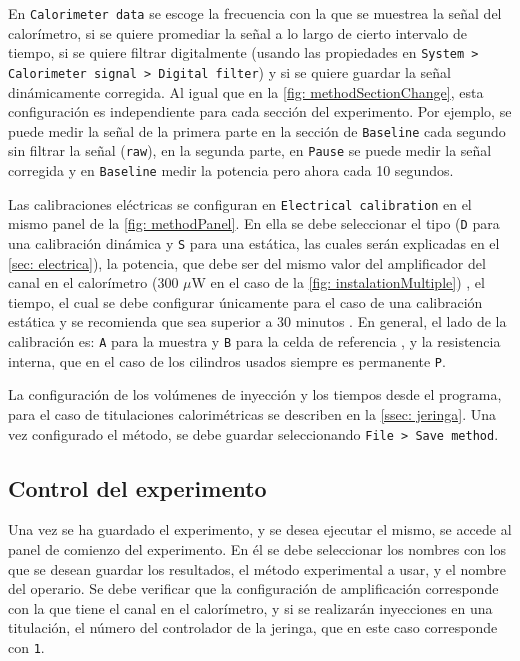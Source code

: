 	En \texttt{Calorimeter data} se escoge la frecuencia con la que se muestrea la se\~nal del calor\'imetro, si se quiere promediar la se\~nal a lo largo de cierto intervalo de tiempo, si se quiere filtrar digitalmente (usando las propiedades en \texttt{System > Calorimeter signal > Digital filter}) y si se quiere guardar la se\~nal din\'amicamente corregida. Al igual que en la \autoref{fig: methodSectionChange}, esta configuraci\'on es independiente para cada secci\'on del experimento. Por ejemplo, se puede medir la se\~nal de la primera parte en la secci\'on de \texttt{Baseline} cada segundo sin filtrar la se\~nal (\texttt{raw}), en la segunda parte, en \texttt{Pause} se puede medir la se\~nal corregida y en \texttt{Baseline} medir la potencia pero ahora cada 10 segundos.
	
	Las calibraciones el\'ectricas se configuran en \texttt{Electrical calibration} en el mismo panel de la \autoref{fig: methodPanel}. En ella se debe seleccionar el tipo (\texttt{D} para una calibraci\'on din\'amica y \texttt{S} para una est\'atica, las cuales ser\'an explicadas en el \autoref{sec: electrica}), la potencia, que debe ser del mismo valor del amplificador del canal en el calor\'imetro (300 $\mu$W en el caso de la \autoref{fig: instalationMultiple}) \cite{Suurkuusk}, el tiempo, el cual se debe configurar \'unicamente para el caso de una calibraci\'on est\'atica y se recomienda que sea superior a 30 minutos \cite{Suurkuusk}. En general, el lado de la calibraci\'on es: \texttt{A} para la muestra y \texttt{B} para la celda de referencia \cite{Suurkuusk}, y la resistencia interna, que en el caso de los cilindros usados siempre es permanente \texttt{P}.
	
	La configuraci\'on de los vol\'umenes de inyecci\'on y los tiempos desde el programa, para el caso de titulaciones calorimétricas se describen en la \autoref{ssec: jeringa}. Una vez configurado el método, se debe guardar seleccionando \texttt{File > Save method}.
	
	\subsection{Control del experimento}
	Una vez se ha guardado el experimento, y se desea ejecutar el mismo, se accede al panel de comienzo del experimento. En \'el se debe seleccionar los nombres con los que se desean guardar los resultados, el m\'etodo experimental a usar, y el nombre del operario. Se debe verificar que la configuraci\'on de amplificaci\'on corresponde con la que tiene el canal en el calor\'imetro, y si se realizar\'an inyecciones en una titulaci\'on, el n\'umero del controlador de la jeringa, que en este caso corresponde con \texttt{1}.
	

